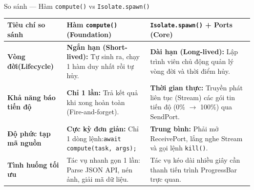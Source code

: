 \documentclass[aspectratio=169, 10pt]{beamer}
\begin{document}
\begin{frame}{So sánh --- Hàm \texttt{compute()} vs \texttt{Isolate.spawn()}}
  \vspace{0.1cm}
  \centering
  \small
  \setlength{\tabcolsep}{4pt}
  \renewcommand{\arraystretch}{1.42}
  \begin{tabular}{|>{\raggedright\arraybackslash}p{2.6cm}|>{\raggedright\arraybackslash}p{5.1cm}|>{\raggedright\arraybackslash}p{5.3cm}|}
    \hline
    \rowcolor{TableHead}
    \centering\color{white}\textbf{Tiêu chí so sánh} & \centering\color{white}\textbf{Hàm \texttt{compute()} (Foundation)} & \centering\color{white}\textbf{\texttt{Isolate.spawn()} + Ports (Core)} \tabularnewline
    \hline
    \rowcolor{TableRowOdd}
    \textbf{Vòng đời\newline (Lifecycle)} & \textbf{Ngắn hạn (Short-lived):} Tự sinh ra, chạy 1 hàm duy nhất rồi tự hủy. & \textbf{Dài hạn (Long-lived):} Lập trình viên chủ động quản lý vòng đời và thời điểm hủy. \tabularnewline
    \hline
    \rowcolor{TableRowEven}
    \textbf{Khả năng báo tiến độ} & \textbf{Chỉ 1 lần:} Trả kết quả khi xong hoàn toàn (Fire-and-forget). & \textbf{Thời gian thực:} Truyền phát liên tục (Stream) các gói tin tiến độ (0\% $\rightarrow$ 100\%) qua SendPort. \tabularnewline
    \hline
    \rowcolor{TableRowOdd}
    \textbf{Độ phức tạp mã nguồn} & \textbf{Cực kỳ đơn giản:} Chỉ 1 dòng lệnh:\newline \texttt{await compute(task, args);} & \textbf{Trung bình:} Phải mở ReceivePort, lắng nghe Stream và gọi lệnh \texttt{kill()}. \tabularnewline
    \hline
    \rowcolor{TableRowEven}
    \textbf{Tình huống tối ưu} & Tác vụ nhanh gọn 1 lần: Parse JSON API, nén ảnh, giải mã dữ liệu. & Tác vụ kéo dài nhiều giây cần thanh tiến trình ProgressBar trực quan. \tabularnewline
    \hline
  \end{tabular}
\end{frame}
\end{document}

